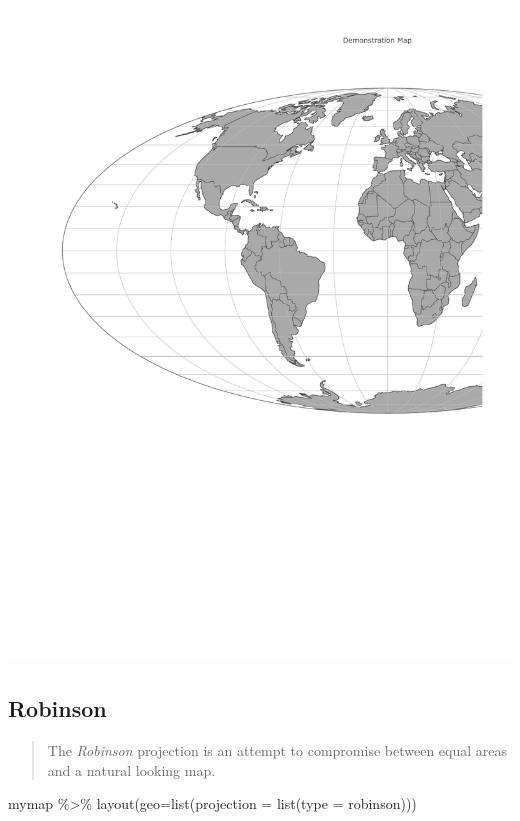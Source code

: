 \documentclass[
  letterpaper,
  DIV=11,
  numbers=noendperiod,
  oneside]{scrreprt}
\newenvironment{Shaded}{\begin{snugshade}}{\end{snugshade}}
\newcommand{\AttributeTok}[1]{\textcolor[rgb]{0.40,0.45,0.13}{#1}}
\newcommand{\FunctionTok}[1]{\textcolor[rgb]{0.28,0.35,0.67}{#1}}
\newcommand{\NormalTok}[1]{\textcolor[rgb]{0.00,0.23,0.31}{#1}}
\newcommand{\SpecialCharTok}[1]{\textcolor[rgb]{0.37,0.37,0.37}{#1}}
\newcommand{\StringTok}[1]{\textcolor[rgb]{0.13,0.47,0.30}{#1}}
\begin{document}
\includegraphics{projections_files/figure-pdf/unnamed-chunk-7-1.pdf}

\subsection{Robinson}\label{robinson}

\begin{quote}
The \emph{Robinson} projection is an attempt to compromise between equal
areas and a natural looking map.
\end{quote}

\begin{Shaded}
\begin{Highlighting}[]
\NormalTok{mymap }\SpecialCharTok{\%\textgreater{}\%} 
  \FunctionTok{layout}\NormalTok{(}\AttributeTok{geo=}\FunctionTok{list}\NormalTok{(}\AttributeTok{projection =} \FunctionTok{list}\NormalTok{(}\AttributeTok{type =} \StringTok{\textquotesingle{}robinson\textquotesingle{}}\NormalTok{)))}
\end{Highlighting}
\end{Shaded}
\end{document}
